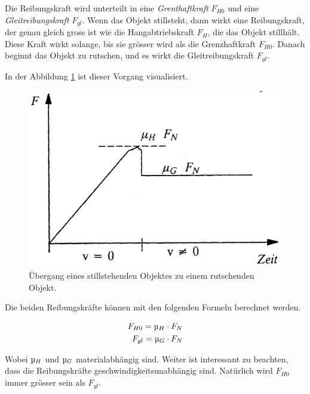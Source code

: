 Die Reibungskraft wird  unterteilt  in eine \textit{Grenthaftkraft} $F_{H0}$ und
eine  \textit{Gleitreibungskraft} $F_{gl}$. Wenn  das  Objekt  stillsteht,  dann
wirkt eine Reibungskraft, der  genau  gleich gross ist wie die Hangabtriebskraft
$F_H$, die das Objekt stillh\"alt. Diese Kraft wirkt solange, bis sie  gr\"osser
wird als die Grenzhaftkraft $F_{H0}$. Danach beginnt das Objekt zu rutschen, und
es wirkt die Gleitreibungskraft $F_{gl}$.

In der Abbildung \ref{fig:haft_gleit_uebergang} ist dieser Vorgang visualisiert.

\begin{figure}[H]
    \centering
    \includegraphics[width=.7\linewidth]{images/haft_gleit_uebergang}
    \caption{\"Ubergang eines stillstehenden Objektes zu einem rutschenden Objekt.}
    \label{fig:haft_gleit_uebergang}
\end{figure}

Die beiden Reibungskr\"afte k\"onnen mit den folgenden Formeln berechnet werden.

\begin{align}
    F_{H0} = \micro_H\cdot F_N \\
    F_{gl} = \micro_G\cdot F_N
\end{align}

Wobei  $\micro_H$   und   $\micro_G$   materialabh\"angig  sind.  Weiter  ist
interessant  zu beachten, dass die Reibungskr\"afte geschwindigkeitsunabh\"angig
sind. Nat\"urlich wird $F_{H0}$ immer gr\"osser sein als $F_{gl}$.

